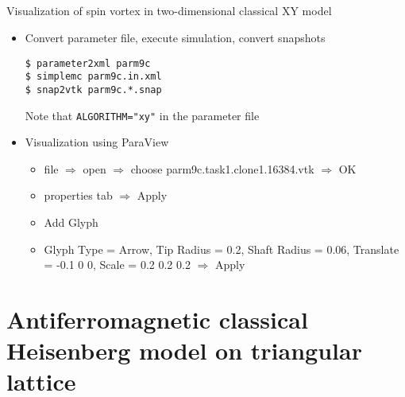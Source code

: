 \subsection*{\redb\whiteb\greenm}
\begin{frame}[t,fragile]{Visualization of spin vortex in two-dimensional classical XY model}
  \begin{itemize}
  \item Convert parameter file, execute simulation, convert snapshots
\begin{lstlisting}
$ parameter2xml parm9c
$ simplemc parm9c.in.xml
$ snap2vtk parm9c.*.snap
\end{lstlisting}
Note that \verb+ALGORITHM="xy"+ in the parameter file
  \item Visualization using ParaView
    \begin{itemize}
      \item file $\Rightarrow$ open $\Rightarrow$ choose parm9c.task1.clone1.16384.vtk $\Rightarrow$ OK
      \item properties tab $\Rightarrow$ Apply
      \item Add Glyph
      \item Glyph Type = Arrow, Tip Radius = 0.2, Shaft Radius = 0.06, Translate = -0.1 0 0, Scale = 0.2 0.2 0.2 $\Rightarrow$ Apply
    \end{itemize}
  \end{itemize}
\end{frame}

\section{Antiferromagnetic classical Heisenberg model on triangular lattice}

